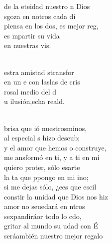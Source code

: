 \documentclass[12pt]{article}
\begin{document}
\begin{multicols*}{2}
\begin{cancion}%
	de la eteidad nuestro n Dios\\
	sgoza en notros cada dí\\
	piensa en los dos, es  mejor reg,\\
	es mpartir su vida \\
	en nuestras vis.\\\jump\\
	\begin{chorus}%
	estra amistad stransfor \\
	en un e con laslas de cris \\
	 rosal  medio del d \\
	u ilusión,echa reald.\\
	\end{chorus}%
	\jump\\
	brisa que ió nuestrosminos,\\
	al especial s hizo descub;\\
	y el amor que hemos o construye,\\
	me ansformó en ti, y a ti en mí\\
	quiero proter, sólo esarte\\
	la ta que ppongo en mi ino;\\
	si me dejas sólo, ¿ees que escil \\
	constir la unidad que Dios nos hiz\\
	amor no seuedará en ntros\\
	sexpandiráor todo lo cdo,\\
	gritar al mundo su udad con É\\
	seráambién nuestro mejor regalo\\
\end{cancion}%


\end{multicols*}
\end{document}
